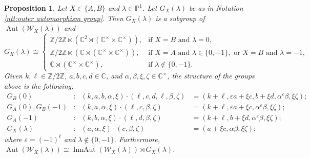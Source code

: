 \documentclass[11pt, svgnames]{amsart}
\newcommand{\ZZ}{\mathbb{Z}}
\newcommand{\CC}{\mathbb{C}}
\newcommand{\PP}{\mathbb{P}}
\newcommand{\W}{\mathcal{W}}
\DeclareMathOperator{\Aut}{Aut}
\DeclareMathOperator{\InnAut}{InnAut}
\newtheorem{proposition}{Proposition}[section]
\theoremstyle{definition}
\begin{document}
\begin{proposition}\label{prop:group structure of outer automorphisms}
    Let $X \in \{A,B\}$ and $\lambda \in \PP^1$. Let $G_X(\lambda)$ be as in Notation \ref{ntt:outer automorphism group}. Then $G_X(\lambda)$ is a subgroup of $\Aut(\W_X(\lambda))$ and
    $$G_X(\lambda) \cong \begin{cases}
        \ZZ/2\ZZ \ltimes (\CC^2 \rtimes (\CC^\times \times \CC^\times)), &\text{if } X = B \text{ and } \lambda = 0, \\
        \ZZ/2\ZZ \ltimes (\CC \rtimes (\CC^\times \times \CC^\times)), &\text{if } X = A \text{ and } \lambda \in \{0,-1\}, \text{ or } X = B \text{ and } \lambda = -1, \\
        \CC \rtimes (\CC^\times \times \CC^\times), &\text{if } \lambda \notin \{0,-1\}.
    \end{cases}$$
    Given $k,\ell \in \ZZ/2\ZZ$, $a,b,c,d \in \CC$, and $\alpha,\beta,\xi,\zeta \in \CC^\times$, the structure of the groups above is the following:
    \begin{align*}
        G_B(0) &\colon &(k,a,b,\alpha,\xi) \cdot (\ell,c,d,\ell,\beta,\zeta) &= (k + \ell, \varepsilon a + \xi c, b + \xi d, \alpha^{\varepsilon}\beta, \xi \zeta); \\
        G_A(0), G_B(-1) &\colon &(k,a,\alpha,\xi) \cdot (\ell,c,\beta,\zeta) &= (k + \ell, \varepsilon a + \xi c, \alpha^{\varepsilon}\beta, \xi \zeta); \\
        G_A(-1) &\colon &(k,b,\alpha,\xi) \cdot (\ell,d,\beta,\zeta) &= (k + \ell, b + \xi d, \alpha^{\varepsilon}\beta, \xi \zeta); \\
        G_X(\lambda) &\colon &(a,\alpha,\xi) \cdot (c,\beta,\zeta) &= (a + \xi c, \alpha \beta, \xi \zeta);
    \end{align*}
    where $\varepsilon = (-1)^\ell$ and $\lambda \notin \{0,-1\}$. Furthermore, $\Aut(\W_X(\lambda)) \cong \InnAut(\W_X(\lambda)) \rtimes G_X(\lambda)$.
\end{proposition}
\end{document}
